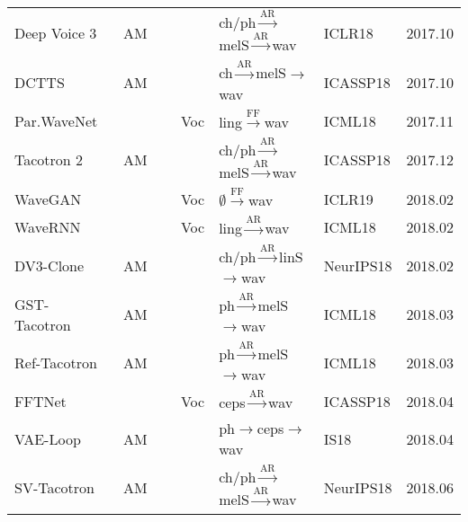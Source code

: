 \documentclass{article}
\begin{document}
\begin{center}
\begin{longtable}{l | l | l | l | l }
		Deep Voice 3~\cite{ping2018deep}           & AM       &  {\color{blue}ch/ph}$\stackrel{\text{AR}}{\longrightarrow}${\color{red}melS}$\stackrel{\text{AR}}{\longrightarrow}$wav     & ICLR18 & 2017.10        \\
		DCTTS~\cite{tachibana2018efficiently}           & AM       &  {\color{blue}ch}$\stackrel{\text{AR}}{\longrightarrow}${\color{red}melS}$\stackrel{}{\longrightarrow}$wav     & ICASSP18 & 2017.10        \\
		Par.WaveNet~\cite{oord2018parallel}       & ~~~~~~~~Voc &  {\color{blue}ling}$\stackrel{\text{FF}}{\longrightarrow}$wav     & ICML18 &  2017.11        \\
		Tacotron 2~\cite{shen2018natural}   & AM   &  {\color{blue}ch/ph}$\stackrel{\text{AR}}{\longrightarrow}${\color{red}melS}$\stackrel{\text{AR}}{\longrightarrow}$wav             & ICASSP18 & 2017.12        \\
        WaveGAN~\cite{donahue2018adversarial}                & ~~~~~~~~Voc      & $\emptyset\stackrel{\text{FF}}{\longrightarrow}$wav          & ICLR19 & 2018.02         \\
		WaveRNN~\cite{kalchbrenner2018efficient}                & ~~~~~~~~Voc      & {\color{green}ling}$\stackrel{\text{AR}}{\longrightarrow}$wav          & ICML18 & 2018.02          \\
		DV3-Clone~\cite{arik2018neural}   & AM   &  {\color{blue}ch/ph}$\stackrel{\text{AR}}{\longrightarrow}${\color{red}linS}$\rightarrow$wav             & NeurIPS18 &  2018.02        \\
		GST-Tacotron~\cite{wang2018style}   & AM   &  {\color{blue}ph}$\stackrel{\text{AR}}{\longrightarrow}${\color{red}melS}$\rightarrow$wav             & ICML18 & 2018.03        \\
		Ref-Tacotron~\cite{skerry2018towards}   & AM   &  {\color{blue}ph}$\stackrel{\text{AR}}{\longrightarrow}${\color{red}melS}$\rightarrow$wav             & ICML18 & 2018.03        \\
		FFTNet~\cite{jin2018fftnet}                 & ~~~~~~~~Voc      & {\color{red}ceps}$\stackrel{\text{AR}}{\longrightarrow}$wav          & ICASSP18&  2018.04          \\
		VAE-Loop~\cite{akuzawa2018expressive}               & AM &{\color{blue}ph}$\rightarrow${\color{red}ceps}$\stackrel{}{\longrightarrow}$wav       & IS18 &2018.04     \\
		SV-Tacotron~\cite{jia2018transfer}   & AM   &  {\color{blue}ch/ph}$\stackrel{\text{AR}}{\longrightarrow}${\color{red}melS}$\stackrel{\text{AR}}{\longrightarrow}$wav             & NeurIPS18 & 2018.06        \\

\end{longtable}
\end{center}
\end{document}
